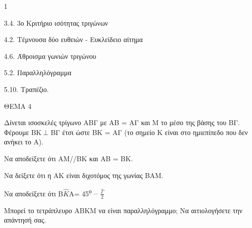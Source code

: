\begin{ylh}{1}
    \item 3.4. 3ο Κριτήριο ισότητας τριγώνων
    \item 4.2. Τέμνουσα δύο ευθειών - Ευκλείδειο αίτημα
    \item 4.6. Άθροισμα γωνιών τριγώνου
    \item 5.2. Παραλληλόγραμμα
    \item 5.10. Τραπέζιο.
\end{ylh}

ΘΕΜΑ 4

Δίνεται ισοσκελές τρίγωνο ΑΒΓ με ΑΒ = ΑΓ και Μ το μέσο της βάσης του ΒΓ. Φέρουμε ΒΚ$\ \bot$ ΒΓ έτσι ώστε ΒΚ = ΑΓ (το σημείο Κ είναι στο ημιεπίπεδο που δεν ανήκει το Α).

\begin{alist}
\item Να αποδείξετε ότι ΑΜ//ΒΚ και ΑΒ = ΒΚ. 

\item Να δείξετε ότι η ΑΚ είναι διχοτόμος της γωνίας ΒΑΜ. 

\item Να αποδείξετε ότι B$\widehat{Κ}$A= 45\textsuperscript{ο \_} $\frac{\widehat{\Gamma}}{2}$ 

\item Μπορεί το τετράπλευρο ΑΒΚΜ να είναι παραλληλόγραμμο; Να αιτιολογήσετε την απάντησή σας. 
\end{alist}
